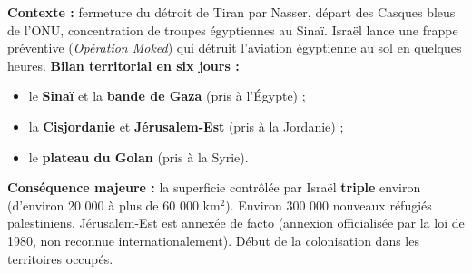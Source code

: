 \documentclass[11pt]{article}
\begin{document}
\begin{exemplebox}
\textbf{Contexte :} fermeture du détroit de Tiran par Nasser, départ des Casques bleus de l'ONU, concentration de troupes égyptiennes au Sinaï. Israël lance une frappe préventive (\emph{Opération Moked}) qui détruit l'aviation égyptienne au sol en quelques heures.
\textbf{Bilan territorial en six jours :}
\begin{itemize}
    \item le \textbf{Sinaï} et la \textbf{bande de Gaza} (pris à l'Égypte) ;
    \item la \textbf{Cisjordanie} et \textbf{Jérusalem-Est} (pris à la Jordanie) ;
    \item le \textbf{plateau du Golan} (pris à la Syrie).
\end{itemize}
\textbf{Conséquence majeure :} la superficie contrôlée par Israël \textbf{triple} environ (d'environ 20 000 à plus de 60 000 km$^2$). Environ 300 000 nouveaux réfugiés palestiniens. Jérusalem-Est est annexée de facto (annexion officialisée par la loi de 1980, non reconnue internationalement). Début de la colonisation dans les territoires occupés.
\end{exemplebox}
\end{document}
